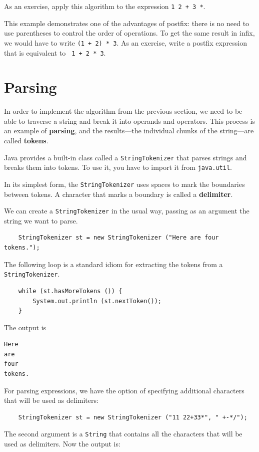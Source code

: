 \documentclass[12pt]{book}
\theoremstyle{exercise}
\begin{document}
As an exercise, apply this algorithm to the expression
{\tt 1 2 + 3 *}.

This example demonstrates one of the advantages of postfix: there is
no need to use parentheses to control the order of operations.  To get
the same result in infix, we would have to write {\tt (1 + 2) * 3}.
As an exercise, write a postfix expression that is equivalent to {\tt
1 + 2 * 3}.


\section {Parsing}

In order to implement the algorithm from the previous section,
we need to be able to traverse a string and break it into operands
and operators.  This process is an example of {\bf parsing}, and
the results---the individual chunks of the string---are called
{\bf tokens}.

Java provides a built-in class called a {\tt StringTokenizer}
that parses strings and breaks them into tokens.  To use it, you
have to import it from {\tt java.util}.

In its simplest form, the {\tt StringTokenizer} uses spaces
to mark the boundaries between tokens.  A character that marks
a boundary is called a {\bf delimiter}.

We can create a {\tt StringTokenizer} in the usual way, passing
as an argument the string we want to parse.

\begin{verbatim}
    StringTokenizer st = new StringTokenizer ("Here are four tokens.");
\end{verbatim}
%
The following loop is a standard idiom for extracting the tokens
from a {\tt StringTokenizer}.

\begin{verbatim}
    while (st.hasMoreTokens ()) {
        System.out.println (st.nextToken());
    }
\end{verbatim}
%
The output is

\begin{verbatim}
Here
are
four
tokens.
\end{verbatim}
%
For parsing expressions, we have the option of specifying additional
characters that will be used as delimiters:

\begin{verbatim}
    StringTokenizer st = new StringTokenizer ("11 22+33*", " +-*/");
\end{verbatim}
%
The second argument is a {\tt String} that contains all the characters
that will be used as delimiters.  Now the output is:
\end{document}
